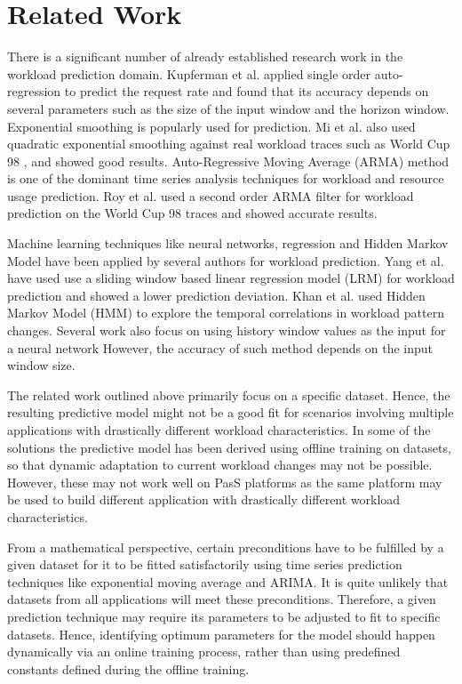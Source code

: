 \section{Related Work}

There is a significant number of already established research work in the workload prediction domain. Kupferman et al. \cite{Kupferman_2009} applied single order auto-regression to predict the request rate and found that its accuracy depends on several parameters such as the size of the input window and the horizon window. Exponential smoothing is popularly used for prediction. Mi et al. \cite{Mi_2010} also used quadratic exponential smoothing against real workload traces such as World Cup 98 \cite{WorldCup_1998}, and showed good results. Auto-Regressive Moving Average (ARMA) method is one of the dominant time series analysis techniques for workload and resource usage prediction. Roy et al. \cite{Roy_2011} used a second order ARMA filter for workload prediction on the World Cup 98 traces and showed accurate results.

Machine learning techniques like neural networks, regression and Hidden Markov Model have been applied by several authors for workload prediction. Yang et al.\cite{Yang_2013} have used use a sliding window based linear regression model (LRM) for workload prediction and showed a lower prediction deviation. Khan et al. \cite{Khan_2012} used Hidden Markov Model (HMM) to explore the temporal correlations in workload pattern changes. Several work also focus on using history window values as the input for a neural network \cite{Islam_2012} However, the accuracy of such method depends on the input window size.

The related work outlined above primarily focus on a specific dataset. Hence, the resulting predictive model might not be a good fit for scenarios involving multiple applications with drastically different workload characteristics. In some of the solutions the predictive model has been derived using offline training on datasets, so that dynamic adaptation to current workload changes may not be possible. However, these may not work well on PasS platforms as the same platform may be used to build different application with drastically different workload characteristics.

From a mathematical perspective, certain preconditions have to be fulfilled by a given dataset for it to be fitted satisfactorily using time series prediction techniques like exponential moving average and ARIMA. It is quite unlikely that datasets from all applications will meet these preconditions. Therefore, a given prediction technique may require its parameters to be adjusted to fit to specific datasets. Hence, identifying optimum parameters for the model should happen dynamically via an online training process, rather than using predefined constants defined during the offline training.